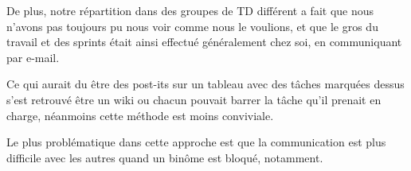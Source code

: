 De plus, notre répartition dans des groupes de TD différent a fait que nous n'avons pas toujours pu nous voir
comme nous le voulions, et que le gros du travail et des sprints était ainsi effectué généralement chez soi, en
communiquant par e-mail.

Ce qui aurait du être des post-its sur un tableau avec des tâches marquées dessus s'est retrouvé être un wiki
ou chacun pouvait barrer la tâche qu'il prenait en charge, néanmoins cette méthode est moins conviviale.

Le plus problématique dans cette approche est que la communication est plus difficile avec les autres
quand un binôme est bloqué, notamment.
